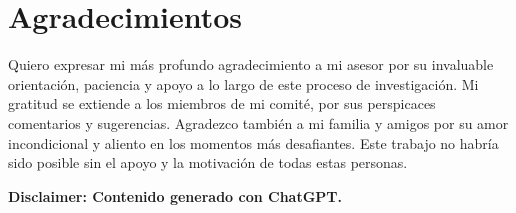 \chapter{Agradecimientos}

Quiero expresar mi más profundo agradecimiento a mi asesor por su invaluable orientación, paciencia y apoyo a lo largo de este proceso de investigación. Mi gratitud se extiende a los miembros de mi comité, por sus perspicaces comentarios y sugerencias. Agradezco también a mi familia y amigos por su amor incondicional y aliento en los momentos más desafiantes. Este trabajo no habría sido posible sin el apoyo y la motivación de todas estas personas.

\textbf{Disclaimer: Contenido generado con ChatGPT.}